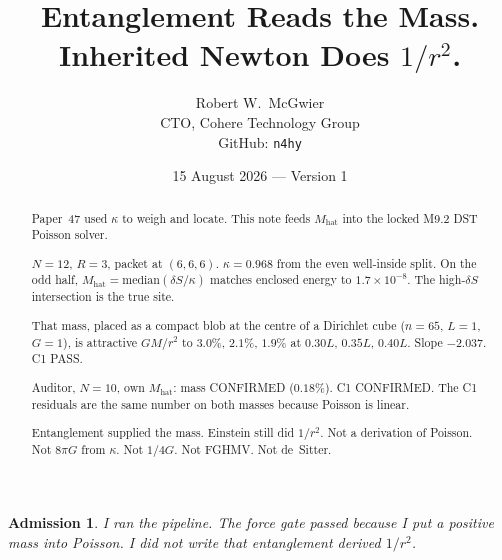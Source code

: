 \documentclass[11pt]{article}
\title{\textbf{Entanglement Reads the Mass.\\
Inherited Newton Does $1/r^2$.}}
\author{Robert W.\ McGwier\\
\small CTO, Cohere Technology Group\\
\small GitHub: \texttt{n4hy}}
\date{15 August 2026 --- Version 1}
\newtheorem*{admission}{Admission}
\begin{document}
\maketitle

\begin{abstract}
\noindent
Paper~47 used $\kappa$ to weigh and locate. This note
feeds $M_{\mathrm{hat}}$ into the locked M9.2 DST Poisson
solver.

$N=12$, $R=3$, packet at $(6,6,6)$. $\kappa=0.968$ from
the even well-inside split. On the odd half,
$M_{\mathrm{hat}}=\mathrm{median}(\delta S/\kappa)$ matches
enclosed energy to $1.7\times 10^{-8}$. The high-$\delta S$
intersection is the true site.

That mass, placed as a compact blob at the centre of a
Dirichlet cube ($n=65$, $L=1$, $G=1$), is attractive
$GM/r^2$ to $3.0\%$, $2.1\%$, $1.9\%$ at
$0.30L$, $0.35L$, $0.40L$. Slope $-2.037$. C1 PASS.

Auditor, $N=10$, own $M_{\mathrm{hat}}$: mass CONFIRMED
($0.18\%$). C1 CONFIRMED. The C1 residuals are the same
number on both masses because Poisson is linear.

Entanglement supplied the mass. Einstein still did
$1/r^2$. Not a derivation of Poisson. Not $8\pi G$ from
$\kappa$. Not $1/4G$. Not FGHMV. Not de~Sitter.
\end{abstract}

\begin{admission}
I ran the pipeline. The force gate passed because I put a
positive mass into Poisson. I did not write that
entanglement derived $1/r^2$.
\end{admission}
\end{document}
